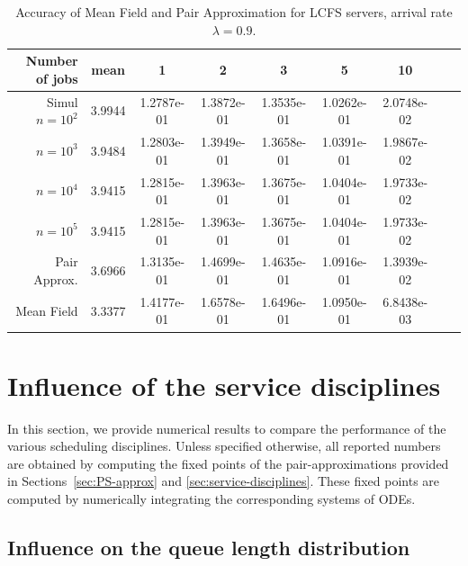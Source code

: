 \documentclass[acmsmall,nonacm]{acmart}
\newcommand\red[1]{{#1}}
\begin{document}
\begin{table}[t]
    \centering
    \begin{tabular}{|r|c|c|c|c|c|c|c|c|}
    \hline 
        Number of jobs & mean & 1 & 2 & 3 & 5 & 10\\ \hline
         \hline
Simul $n=10^2$&   3.9944 & 1.2787e-01 &  1.3872e-01 &  1.3535e-01 &  1.0262e-01 &  2.0748e-02\\
   $n=10^3$& 3.9484 &  1.2803e-01&   1.3949e-01&   1.3658e-01&   1.0391e-01&   1.9867e-02\\
   $n=10^4$& 3.9415 &  1.2815e-01&   1.3963e-01&   1.3675e-01&   1.0404e-01&   1.9733e-02\\
   $n=10^5$& 3.9415 &  1.2815e-01&   1.3963e-01&   1.3675e-01&   1.0404e-01&   1.9733e-02\\\hline
  Pair Approx. & 3.6966 &  1.3135e-01&   1.4699e-01&   1.4635e-01&   1.0916e-01&   1.3939e-02\\\hline
  Mean Field & 3.3377 &  1.4177e-01&   1.6578e-01&   1.6496e-01&   1.0950e-01&   6.8438e-03\\
         \hline
    \end{tabular}
    \caption{Accuracy of Mean Field and Pair Approximation for LCFS servers, arrival rate $\lambda=0.9$. }
    \label{tab:simulPAIR09LCFS}
\end{table}




\section{Influence of the service disciplines}
\label{sec:numerical}

In this section, we provide numerical results to compare the performance of the various scheduling disciplines. \red{Unless specified otherwise, all reported numbers are obtained by computing the fixed points of the pair-approximations provided in Sections~\ref{sec:PS-approx} and \ref{sec:service-disciplines}. These fixed points are computed by numerically integrating the corresponding systems of ODEs.}



\subsection{Influence on the queue length distribution}
\end{document}
